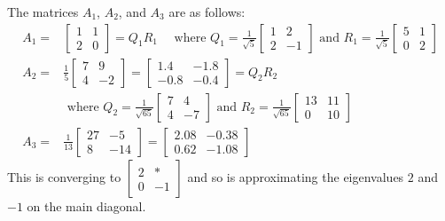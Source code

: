 \documentclass{ximera}
\begin{document}
\begin{example}
\begin{explanation}
    The matrices $A_{1}$, $A_{2}$, and $A_{3}$ are as follows:
\begin{align*}
A_{1} = & \left[ \begin{array}{rr}
1 & 1 \\
2 & 0
\end{array}\right] = Q_{1}R_{1} \quad \mbox{ where } Q_{1} = \frac{1}{\sqrt{5}}\left[ \begin{array}{rr}
1 & 2 \\
2 & -1
\end{array}\right] \mbox{ and } R_{1} =  \frac{1}{\sqrt{5}}\left[ \begin{array}{rr}
5 & 1 \\
0 & 2
\end{array}\right] \\
A_{2} = & \frac{1}{5}\left[ \begin{array}{rr}
7 & 9 \\
4 & -2
\end{array}\right] = \left[ \begin{array}{rr}
1.4 & -1.8 \\
-0.8 & -0.4
\end{array}\right]= Q_{2}R_{2} \\
&\mbox{ where } Q_{2} = \frac{1}{\sqrt{65}}\left[ \begin{array}{rr}
7 & 4 \\
4 & -7
\end{array}\right] \mbox{ and } R_{2} =  \frac{1}{\sqrt{65}}\left[ \begin{array}{rr}
13 & 11 \\
0 & 10
\end{array}\right] \\
A_{3} = &\frac{1}{13}\left[ \begin{array}{rr}
27 & -5 \\
8 & -14
\end{array}\right] = \left[ \begin{array}{rr}
2.08 & -0.38 \\
0.62 & -1.08
\end{array}\right]
\end{align*}
This is converging to $\left[ \begin{array}{rr}
2 & \ast \\
0 & -1
\end{array}\right]$ and so is approximating the eigenvalues $2$ and $-1$ on the main diagonal.
\end{explanation}
\end{example}
    
\end{document}
